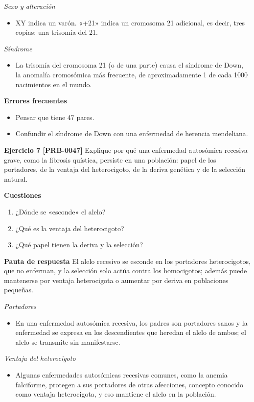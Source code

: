 \documentclass{book}
\begin{document}
\noindent\textit{Sexo y alteración}
\begin{itemize}
\item XY indica un varón. «+21» indica un cromosoma 21 adicional, es decir, tres copias: una trisomía del 21.
\end{itemize}

\noindent\textit{Síndrome}
\begin{itemize}
\item La trisomía del cromosoma 21 (o de una parte) causa el síndrome de Down, la anomalía cromosómica más frecuente, de aproximadamente 1 de cada 1000 nacimientos en el mundo.
\end{itemize}

\noindent\textbf{Errores frecuentes}
\begin{itemize}
\item Pensar que tiene 47 pares.
\item Confundir el síndrome de Down con una enfermedad de herencia mendeliana.
\end{itemize}

\noindent\textbf{Ejercicio 7 [PRB-0047]}
Explique por qué una enfermedad autosómica recesiva grave, como la fibrosis quística, persiste en una población: papel de los portadores, de la ventaja del heterocigoto, de la deriva genética y de la selección natural.


\noindent\textbf{Cuestiones}
\begin{enumerate}
\item ¿Dónde se «esconde» el alelo?
\item ¿Qué es la ventaja del heterocigoto?
\item ¿Qué papel tienen la deriva y la selección?
\end{enumerate}

\noindent\textbf{Pauta de respuesta}
El alelo recesivo se esconde en los portadores heterocigotos, que no enferman, y la selección solo actúa contra los homocigotos; además puede mantenerse por ventaja heterocigota o aumentar por deriva en poblaciones pequeñas.


\noindent\textit{Portadores}
\begin{itemize}
\item En una enfermedad autosómica recesiva, los padres son portadores sanos y la enfermedad se expresa en los descendientes que heredan el alelo de ambos; el alelo se transmite sin manifestarse.
\end{itemize}

\noindent\textit{Ventaja del heterocigoto}
\begin{itemize}
\item Algunas enfermedades autosómicas recesivas comunes, como la anemia falciforme, protegen a sus portadores de otras afecciones, concepto conocido como ventaja heterocigota, y eso mantiene el alelo en la población.
\end{itemize}
\end{document}

